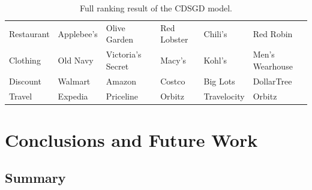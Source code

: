 \documentclass[a4paper,12pt,twoside,openright]{report}
\begin{document}
\begin{table}
\begin{tabular}{l|lllll}
Restaurant     & Applebee's           & Olive Garden          & Red Lobster       & Chili's               & Red Robin          \\
Clothing       & Old Navy             & Victoria's Secret     & Macy's            & Kohl's                & Men's Wearhouse    \\
Discount       & Walmart              & Amazon                & Costco            & Big Lots              & DollarTree         \\
Travel         & Expedia              & Priceline             & Orbitz            & Travelocity           & Orbitz             \\ \hline
\end{tabular}
\caption{Full ranking result of the CDSGD model.}
\label{tab:chap5:brand_eval}
\end{table}






\chapter{Conclusions and Future Work} 
\label{ch6}

\section{Summary}
\end{document}
